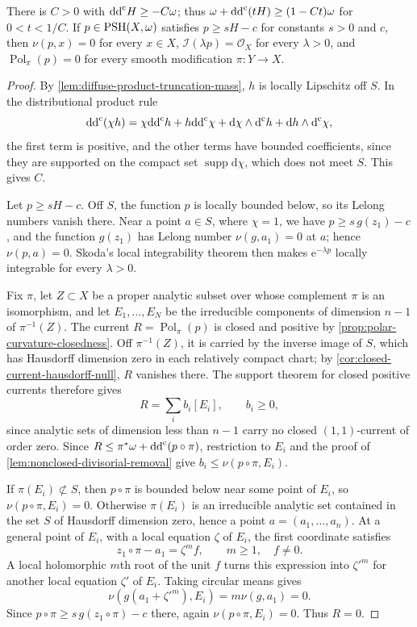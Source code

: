 \begin{lemma}\label{lem:diffuse-cutoff-polar-blindness}
There is $C>0$ with $\mathrm{dd}^{\mathrm{c}} H\geq-C\omega$; thus $\omega+\mathrm{dd}^{\mathrm{c}}(tH)\geq(1-Ct)\omega$ for $0<t<1/C$. If $p\in\mathrm{PSH}(X,\omega)$ satisfies $p\geq sH-c$ for constants $s>0$ and $c$, then $\nu(p,x)=0$ for every $x\in X$, $\mathcal I(\lambda p)=\mathcal O_X$ for every $\lambda>0$, and $\operatorname{Pol}_\pi(p)=0$ for every smooth modification $\pi\colon Y\to X$.
\end{lemma}
\begin{proof}
By \cref{lem:diffuse-product-truncation-mass}, $h$ is locally Lipschitz off $S$. In the distributional product rule
\[
 \mathrm{dd}^{\mathrm{c}}(\chi h)=\chi\mathrm{dd}^{\mathrm{c}} h
       +h\mathrm{dd}^{\mathrm{c}}\chi+\mathrm d\chi\wedge\mathrm d^{\mathrm c} h
       +\mathrm dh\wedge\mathrm d^{\mathrm c}\chi,
\]
the first term is positive, and the other terms have bounded coefficients, since they are supported on the compact set $\operatorname{supp}\mathrm d\chi$, which does not meet $S$. This gives $C$.

Let $p\geq sH-c$. Off $S$, the function $p$ is locally bounded below, so its Lelong numbers vanish there. Near a point $a\in S$, where $\chi=1$, we have $p\geq s\,g(z_1)-c$, and the function $g(z_1)$ has Lelong number $\nu(g,a_1)=0$ at $a$; hence $\nu(p,a)=0$. Skoda's local integrability theorem \cite[Lemma~5.6]{DemAM11} then makes $\mathrm e^{-\lambda p}$ locally integrable for every $\lambda>0$.

Fix $\pi$, let $Z\subset X$ be a proper analytic subset over whose complement $\pi$ is an isomorphism, and let $E_1,\ldots,E_N$ be the irreducible components of dimension $n-1$ of $\pi^{-1}(Z)$. The current $R=\operatorname{Pol}_\pi(p)$ is closed and positive by \cref{prop:polar-curvature-closedness}. Off $\pi^{-1}(Z)$, it is carried by the inverse image of $S$, which has Hausdorff dimension zero in each relatively compact chart; by \cref{cor:closed-current-hausdorff-null}, $R$ vanishes there. The support theorem for closed positive currents \cite[Chapter III, Corollaries 2.11 and 2.14, pp.~141--143]{DemCADG} therefore gives
\[
 R=\sum_i b_i[E_i],\qquad b_i\geq0,
\]
since analytic sets of dimension less than $n-1$ carry no closed $(1,1)$-current of order zero. Since $R\leq\pi^*\omega+\mathrm{dd}^{\mathrm{c}}(p\circ\pi)$, restriction to $E_i$ and the proof of \cref{lem:nonclosed-divisorial-removal} give $b_i\leq\nu(p\circ\pi,E_i)$.

If $\pi(E_i)\not\subset S$, then $p\circ\pi$ is bounded below near some point of $E_i$, so $\nu(p\circ\pi,E_i)=0$. Otherwise $\pi(E_i)$ is an irreducible analytic set contained in the set $S$ of Hausdorff dimension zero, hence a point $a=(a_1,\ldots,a_n)$. At a general point of $E_i$, with a local equation $\zeta$ of $E_i$, the first coordinate satisfies
\[
 z_1\circ\pi-a_1=\zeta^m f,\qquad m\geq1,\quad f\ne0.
\]
A local holomorphic $m$th root of the unit $f$ turns this expression into $\zeta'^m$ for another local equation $\zeta'$ of $E_i$. Taking circular means gives
\[
 \nu(g(a_1+\zeta'^m),E_i)=m\nu(g,a_1)=0.
\]
Since $p\circ\pi\geq s\,g(z_1\circ\pi)-c$ there, again $\nu(p\circ\pi,E_i)=0$. Thus $R=0$.
\end{proof}

